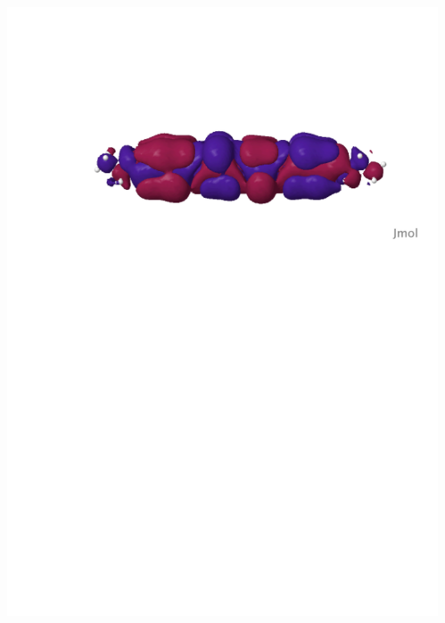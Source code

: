 \begin{frame}
\begin{columns}
\begin{column}[b]{0.48\linewidth}
\begin{center}
    \includegraphics[scale=0.3, clip, viewport = 80 560 600 700]
        {figures/can_orb_2.pdf}
    \end{center}
    \end{column}

    \begin{column}[b]{0.48\linewidth}
    \begin{center}

    \vspace{8mm}


\end{center}
\end{column}
\end{columns}
\end{frame}
